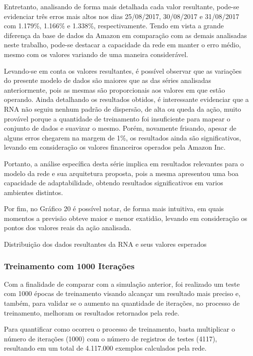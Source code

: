 Entretanto, analisando de forma mais detalhada cada valor resultante, pode-se evidenciar três erros mais altos nos dias 25/08/2017, 30/08/2017 e 31/08/2017 com 1.179\%, 1.166\% e 1.338\%, respectivamente. Tendo em vista a grande diferença da base de dados da Amazon em comparação com as demais analisadas neste trabalho, pode-se destacar a capacidade da rede em manter o erro médio, mesmo com os valores variando de uma maneira considerável.

Levando-se em conta os valores resultantes, é possível observar que as variações do presente modelo de dados são maiores que as das séries analisadas anteriormente, pois as mesmas são proporcionais aos valores em que estão operando. Ainda detalhando os resultados obtidos, é interessante evidenciar que a RNA não seguiu nenhum padrão de dispersão, de alta ou queda da ação, muito provável porque a quantidade de treinamento foi insuficiente para mapear o conjunto de dados e suavizar o mesmo. Porém, novamente frisando, apesar de alguns erros chegarem na margem de 1\%, os resultados ainda são significativos, levando em consideração os valores financeiros operados pela Amazon Inc. 

Portanto, a análise específica desta série implica em resultados relevantes para o modelo da rede e sua arquitetura proposta, pois a mesma apresentou uma boa capacidade de adaptabilidade, obtendo resultados significativos em varios ambientes distintos.

Por fim, no Gráfico 20 é possível notar, de forma mais intuitiva, em quais momentos a previsão obteve maior e menor exatidão, levando em consideração os pontos dos valores reais da ação analisada.
\begin{grafico}[h]
	\centering
	\caption{Distribuição dos dados resultantes da RNA e seus valores esperados}
	\label{lingua}
\end{grafico}

\subsubsection{Treinamento com 1000 Iterações}
Com a finalidade de comparar com a simulação anterior, foi realizado um teste com 1000 épocas de treinamento visando alcançar um resultado mais preciso e, também, para validar se o aumento na quantidade de iterações, no processo de treinamento, melhoram os resultados retornados pela rede.

Para quantificar como ocorreu o processo de treinamento, basta multiplicar o número de iterações (1000) com o número de registros de testes (4117), resultando em um total de 4.117.000 exemplos calculados pela rede.

